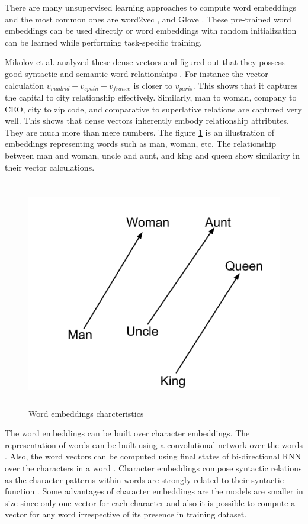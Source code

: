 \documentclass[a4paper, 11pt]{article}
\begin{document}
There are many unsupervised learning approaches to compute word embeddings and the most common ones are word2vec \parencite{mikolov2013efficient}, and Glove \parencite{pennington2014glove}. These pre-trained word embeddings can be used directly or word embeddings with random initialization can be learned while performing task-specific training. 

Mikolov et al. analyzed these dense vectors and figured out that they possess good syntactic and semantic word relationships \parencite{mikolov2013linguistic}. For instance the vector calculation $v_{madrid} - v_{spain} + v_{france}$ is closer to $v_{paris}$.  This shows that it captures the capital to city relationship effectively. Similarly, man to woman, company to CEO, city to zip code, and comparative to superlative relations are captured very well. This shows that dense vectors inherently embody relationship attributes. They are much more than mere numbers. The figure \ref{fig:word_properties} is an illustration of embeddings representing words such as man, woman, etc. The relationship between man and woman, uncle and aunt, and king and queen show similarity in their vector calculations.

\begin{figure}[H]
    \centering
    \includegraphics[width=\textwidth,height=10cm,keepaspectratio=true]
    {word2vec-gender-relation.png}
    \caption{
        Word embeddings charcteristics
    }
    \label{fig:word_properties}
\end{figure}


The word embeddings can be built over character embeddings. The representation of words can be built using a convolutional network over the words \parencite{dos2014deep}. Also, the word vectors can be computed using final states of bi-directional RNN over the characters in a word \parencite{ling-etal-2015-finding}. Character embeddings compose syntactic relations as the character patterns within words are strongly related to their syntactic function \parencite{Goldberg2016}. Some advantages of character embeddings are the models are smaller in size since only one vector for each character and also it is possible to compute a vector for any word irrespective of its presence in training dataset. 
\end{document}
